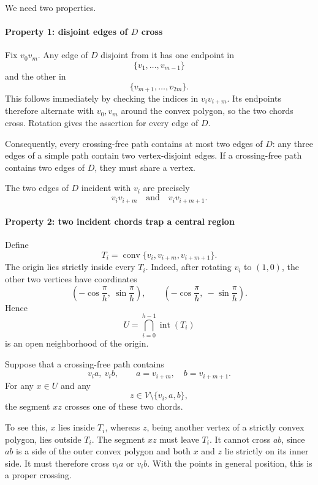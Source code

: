 \documentclass[
  11pt,
  a4paper,
]{article}
\begin{document}
We need two properties.

\paragraph{\texorpdfstring{Property 1: disjoint edges of \(D\)
cross}{Property 1: disjoint edges of D cross}}\label{property-1-disjoint-edges-of-d-cross}

Fix \(v_0v_m\). Any edge of \(D\) disjoint from it has one endpoint in
\[
\{v_1,\ldots,v_{m-1}\}
\] and the other in \[
\{v_{m+1},\ldots,v_{2m}\}.
\] This follows immediately by checking the indices in \(v_i v_{i+m}\).
Its endpoints therefore alternate with \(v_0,v_m\) around the convex
polygon, so the two chords cross. Rotation gives the assertion for every
edge of \(D\).

Consequently, every crossing-free path contains at most two edges of
\(D\): any three edges of a simple path contain two vertex-disjoint
edges. If a crossing-free path contains two edges of \(D\), they must
share a vertex.

The two edges of \(D\) incident with \(v_i\) are precisely \[
v_i v_{i+m}
\quad\text{and}\quad
v_i v_{i+m+1}.
\]

\paragraph{Property 2: two incident chords trap a central
region}\label{property-2-two-incident-chords-trap-a-central-region}

Define \[
T_i=\operatorname{conv}\{v_i,v_{i+m},v_{i+m+1}\}.
\] The origin lies strictly inside every \(T_i\). Indeed, after rotating
\(v_i\) to \((1,0)\), the other two vertices have coordinates \[
\left(-\cos\frac{\pi}{h},\ \sin\frac{\pi}{h}\right),
\qquad
\left(-\cos\frac{\pi}{h},\ -\sin\frac{\pi}{h}\right).
\] Hence \[
U=\bigcap_{i=0}^{h-1}\operatorname{int}(T_i)
\] is an open neighborhood of the origin.

Suppose that a crossing-free path contains \[
v_i a,\ v_i b,
\qquad a=v_{i+m},\quad b=v_{i+m+1}.
\] For any \(x\in U\) and any \[
z\in V\setminus\{v_i,a,b\},
\] the segment \(xz\) crosses one of these two chords.

To see this, \(x\) lies inside \(T_i\), whereas \(z\), being another
vertex of a strictly convex polygon, lies outside \(T_i\). The segment
\(xz\) must leave \(T_i\). It cannot cross \(ab\), since \(ab\) is a
side of the outer convex polygon and both \(x\) and \(z\) lie strictly
on its inner side. It must therefore cross \(v_i a\) or \(v_i b\). With
the points in general position, this is a proper crossing.
\end{document}
